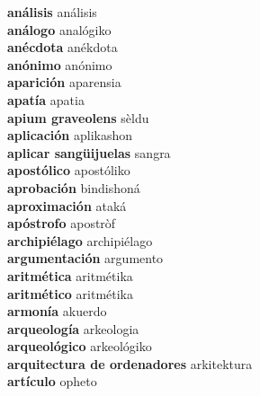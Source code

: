 \textbf{ análisis  } análisis \\
\textbf{ análogo  } analógiko \\
\textbf{ anécdota  } anékdota \\
\textbf{ anónimo  } anónimo \\
\textbf{ aparición  } aparensia \\
\textbf{ apatía  } apatia \\
\textbf{ apium graveolens  } sèldu \\
\textbf{ aplicación  } aplikashon \\
\textbf{ aplicar sangüijuelas  } sangra \\
\textbf{ apostólico  } apostóliko \\
\textbf{ aprobación  } bindishoná \\
\textbf{ aproximación  } ataká \\
\textbf{ apóstrofo  } apostròf \\
\textbf{ archipiélago  } archipiélago \\
\textbf{ argumentación  } argumento \\
\textbf{ aritmética  } aritmétika \\
\textbf{ aritmético  } aritmétika \\
\textbf{ armonía  } akuerdo \\
\textbf{ arqueología  } arkeologia \\
\textbf{ arqueológico  } arkeológiko \\
\textbf{ arquitectura de ordenadores  } arkitektura \\
\textbf{ artículo  } opheto \\

